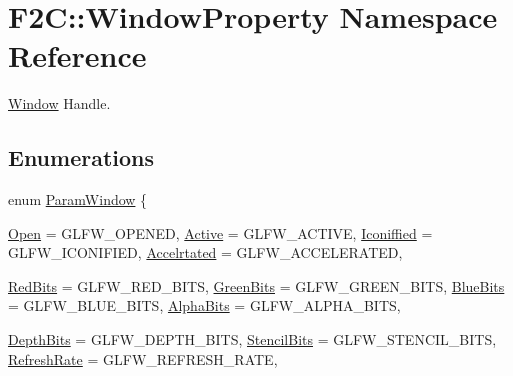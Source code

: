 \hypertarget{namespace_f2_c_1_1_window_property}{
\section{F2C::WindowProperty Namespace Reference}
\label{namespace_f2_c_1_1_window_property}
}


\hyperlink{class_f2_c_1_1_window}{Window} Handle.  
\subsection*{Enumerations}
\begin{DoxyCompactItemize}
\item 
enum \hyperlink{namespace_f2_c_1_1_window_property_a89ec69d0a86f9d0063dfb69a3ebf3fbe}{ParamWindow} \{ \par
\hyperlink{namespace_f2_c_1_1_window_property_a89ec69d0a86f9d0063dfb69a3ebf3fbeab1ca247d18cc697fe3535df2a8b14658}{Open} =  GLFW\_\-OPENED, 
\hyperlink{namespace_f2_c_1_1_window_property_a89ec69d0a86f9d0063dfb69a3ebf3fbeacca3afb69ba0a8ba1f87768956bb7244}{Active} =  GLFW\_\-ACTIVE, 
\hyperlink{namespace_f2_c_1_1_window_property_a89ec69d0a86f9d0063dfb69a3ebf3fbeaf0eb1dc8907d96e6585829b954c76370}{Iconiffied} =  GLFW\_\-ICONIFIED, 
\hyperlink{namespace_f2_c_1_1_window_property_a89ec69d0a86f9d0063dfb69a3ebf3fbea7edc13366a77ca571f220366df3f2b28}{Accelrtated} =  GLFW\_\-ACCELERATED, 
\par
\hyperlink{namespace_f2_c_1_1_window_property_a89ec69d0a86f9d0063dfb69a3ebf3fbeab8f44786e106553b7050ae8eee99d7f8}{RedBits} =  GLFW\_\-RED\_\-BITS, 
\hyperlink{namespace_f2_c_1_1_window_property_a89ec69d0a86f9d0063dfb69a3ebf3fbea4dee6d7138e48c540f0f4ed0477a77c2}{GreenBits} =  GLFW\_\-GREEN\_\-BITS, 
\hyperlink{namespace_f2_c_1_1_window_property_a89ec69d0a86f9d0063dfb69a3ebf3fbea85338a728924dbd64a07b90b8b22194b}{BlueBits} =  GLFW\_\-BLUE\_\-BITS, 
\hyperlink{namespace_f2_c_1_1_window_property_a89ec69d0a86f9d0063dfb69a3ebf3fbea9b0ed67e79e0fd706e2b4c1117529d45}{AlphaBits} =  GLFW\_\-ALPHA\_\-BITS, 
\par
\hyperlink{namespace_f2_c_1_1_window_property_a89ec69d0a86f9d0063dfb69a3ebf3fbea3cdefeb2737734a971b18515c181c695}{DepthBits} =  GLFW\_\-DEPTH\_\-BITS, 
\hyperlink{namespace_f2_c_1_1_window_property_a89ec69d0a86f9d0063dfb69a3ebf3fbeacb16c1386b942d0928c7176f30363a19}{StencilBits} =  GLFW\_\-STENCIL\_\-BITS, 
\hyperlink{namespace_f2_c_1_1_window_property_a89ec69d0a86f9d0063dfb69a3ebf3fbea3a7c31c849bd8aca0a4b6f0230021400}{RefreshRate} =  GLFW\_\-REFRESH\_\-RATE, 

\end{DoxyCompactItemize}
